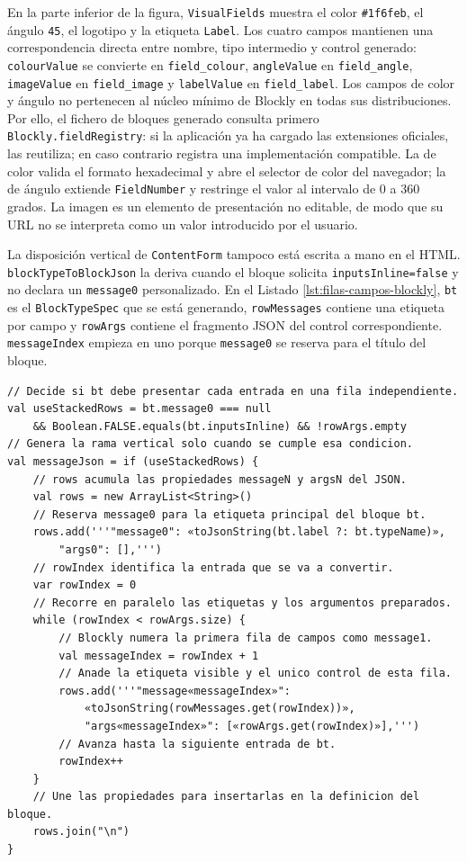En la parte inferior de la figura, \texttt{VisualFields} muestra el color
\texttt{\#1f6feb}, el ángulo \texttt{45}, el logotipo y la etiqueta
\texttt{Label}. Los cuatro campos mantienen una correspondencia directa entre
nombre, tipo intermedio y control generado: \texttt{colourValue} se convierte
en \texttt{field\_colour}, \texttt{angleValue} en \texttt{field\_angle},
\texttt{imageValue} en \texttt{field\_image} y \texttt{labelValue} en
\texttt{field\_label}. Los campos de color y ángulo no pertenecen al núcleo
mínimo de Blockly en todas sus distribuciones. Por ello, el fichero de bloques
generado consulta primero \texttt{Blockly.fieldRegistry}: si la aplicación ya
ha cargado las extensiones oficiales, las reutiliza; en caso contrario registra
una implementación compatible. La de color valida el formato hexadecimal y
abre el selector de color del navegador; la de ángulo extiende
\texttt{FieldNumber} y restringe el valor al intervalo de 0 a 360 grados. La
imagen es un elemento de presentación no editable, de modo que su URL no se
interpreta como un valor introducido por el usuario.

La disposición vertical de \texttt{ContentForm} tampoco está escrita a mano en
el HTML. \texttt{blockTypeToBlockJson} la deriva cuando el bloque solicita
\texttt{inputsInline=false} y no declara un \texttt{message0} personalizado.
En el Listado \ref{lst:filas-campos-blockly}, \texttt{bt} es el
\texttt{BlockTypeSpec} que se está generando, \texttt{rowMessages} contiene una
etiqueta por campo y \texttt{rowArgs} contiene el fragmento JSON del control
correspondiente. \texttt{messageIndex} empieza en uno porque
\texttt{message0} se reserva para el título del bloque.

\begin{lstlisting}[float=htbp, style=tfmxtend, captionpos=t, caption={Generación comentada de una fila por campo cuando \texttt{inputsInline=false}}, label={lst:filas-campos-blockly}]
// Decide si bt debe presentar cada entrada en una fila independiente.
val useStackedRows = bt.message0 === null
    && Boolean.FALSE.equals(bt.inputsInline) && !rowArgs.empty
// Genera la rama vertical solo cuando se cumple esa condicion.
val messageJson = if (useStackedRows) {
    // rows acumula las propiedades messageN y argsN del JSON.
    val rows = new ArrayList<String>()
    // Reserva message0 para la etiqueta principal del bloque bt.
    rows.add('''"message0": «toJsonString(bt.label ?: bt.typeName)»,
        "args0": [],''')
    // rowIndex identifica la entrada que se va a convertir.
    var rowIndex = 0
    // Recorre en paralelo las etiquetas y los argumentos preparados.
    while (rowIndex < rowArgs.size) {
        // Blockly numera la primera fila de campos como message1.
        val messageIndex = rowIndex + 1
        // Anade la etiqueta visible y el unico control de esta fila.
        rows.add('''"message«messageIndex»":
            «toJsonString(rowMessages.get(rowIndex))»,
            "args«messageIndex»": [«rowArgs.get(rowIndex)»],''')
        // Avanza hasta la siguiente entrada de bt.
        rowIndex++
    }
    // Une las propiedades para insertarlas en la definicion del bloque.
    rows.join("\n")
}
\end{lstlisting}

